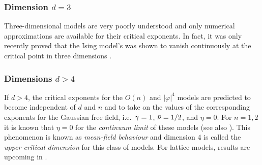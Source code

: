 
\subsubsection{Dimension $d=3$}

Three-dimensional models are very poorly understood and only numerical approximations
are available for their critical exponents. In fact, it was only recently proved
that the Ising model's  was shown to vanish continuously at
the critical point in three dimensions \cite{ADS15}.

\subsubsection{Dimensions $d > 4$}

If $d > 4$, the critical exponents for the $O(n)$ and $|\varphi|^4$ models are
predicted to become independent of $d$ and $n$ and to take on the values of the
corresponding exponents for the Gaussian free field, i.e.\ $\bar\gamma = 1$,
$\bar\nu = 1/2$, and $\eta = 0$. For $n = 1, 2$ it is known that $\eta = 0$
for the \emph{continuum limit} of these models \cite{Aiz82,Fro82} (see also
\cite{Sakai07}).
This phenomenon is known as \emph{mean-field behaviour} and dimension $4$ is
called the \emph{upper-critical dimension} for this class of models.
For lattice models, results are upcoming in \cite{BHH17}.

